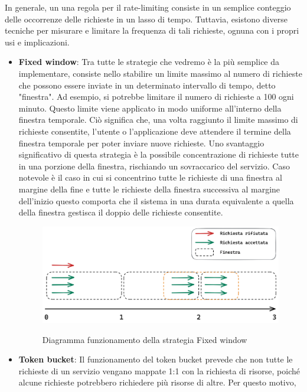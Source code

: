 In generale, un una regola per il rate-limiting consiste in un semplice conteggio delle occorrenze delle richieste in un
lasso di tempo. Tuttavia, esistono diverse tecniche per misurare e limitare la frequenza di tali richieste, ognuna con i
propri usi e implicazioni.
\begin{itemize}
    \item \textbf{Fixed window}: Tra tutte le strategie che vedremo è la più semplice da implementare, consiste nello stabilire un
    limite massimo al numero di richieste che possono essere inviate in un determinato intervallo di tempo, detto
    "finestra". Ad esempio, si potrebbe limitare il numero di richieste a 100 ogni minuto. Questo limite viene applicato in
    modo uniforme all'interno della finestra temporale. Ciò significa che, una volta raggiunto il limite massimo di
    richieste consentite, l'utente o l'applicazione deve attendere il termine della finestra temporale per poter inviare
    nuove richieste. Uno svantaggio significativo di questa strategia è la possibile concentrazione di richieste tutte in
    una porzione della finestra, rischiando un sovraccarico del servizio. Caso notevole è il caso in cui si concentrino tutte
    le richieste di una finestra al margine della fine e tutte le richieste della finestra successiva al margine dell’inizio
    questo comporta che il sistema in una durata equivalente a quella della finestra gestisca il doppio delle richieste
    consentite.
    \begin{figure}[H]
        \centering
        \includegraphics[width=13cm]{./chapters/1.state-of-art/images/1.fixed_window.png}
        \label{fig:fixed-window}
        \captionsetup{justification=centering}
        \caption{Diagramma funzionamento della strategia Fixed window}
    \end{figure}
    \item \textbf{Token bucket}: Il funzionamento del token bucket prevede che non tutte le richieste di un servizio vengano mappate
    1:1 con la richiesta di risorse, poiché alcune richieste potrebbero richiedere più risorse di altre. Per questo motivo,

\end{itemize}
